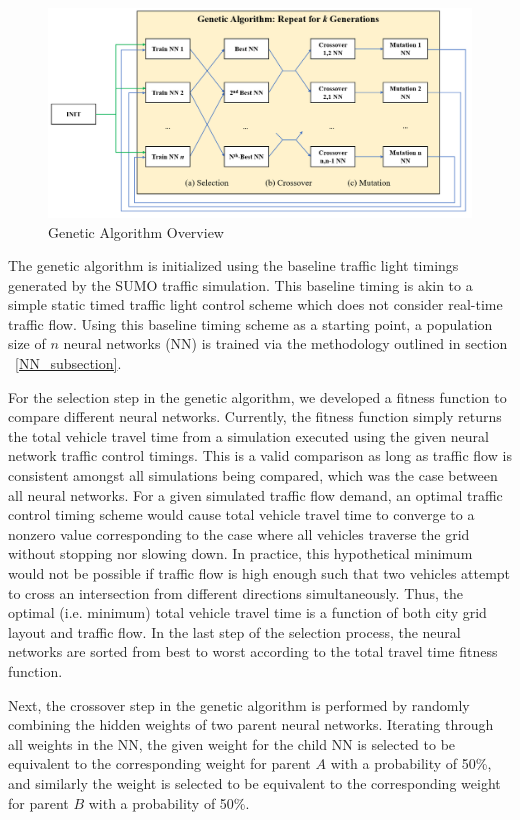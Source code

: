 \documentclass[twocolumn]{article}
\begin{document}
\begin{figure}[htp]
    \centering
    \includegraphics[width=\linewidth]{figures/genetic_overview.PNG}
    \caption{Genetic Algorithm Overview}
    \label{fig:genetic}
\end{figure}

The genetic algorithm is initialized using the baseline traffic light timings generated by the SUMO traffic simulation. This baseline timing is akin to a simple static timed traffic light control scheme which does not consider real-time traffic flow. Using this baseline timing scheme as a starting point, a population size of $n$ neural networks (NN) is trained via the methodology outlined in section ~\ref{NN_subsection}.

For the selection step in the genetic algorithm, we developed a fitness function to compare different neural networks. Currently, the fitness function simply returns the total vehicle travel time from a simulation executed using the given neural network traffic control timings. This is a valid comparison as long as traffic flow is consistent amongst all simulations being compared, which was the case between all neural networks. For a given simulated traffic flow demand, an optimal traffic control timing scheme would cause total vehicle travel time to converge to a nonzero value corresponding to the case where all vehicles traverse the grid without stopping nor slowing down. In practice, this hypothetical minimum would not be possible if traffic flow is high enough such that two vehicles attempt to cross an intersection from different directions simultaneously. Thus, the optimal (i.e. minimum) total vehicle travel time is a function of both city grid layout and traffic flow. In the last step of the selection process, the neural networks are sorted from best to worst according to the total travel time fitness function.

Next, the crossover step in the genetic algorithm is performed by randomly combining the hidden weights of two parent neural networks. Iterating through all weights in the NN, the given weight for the child NN is selected to be equivalent to the corresponding weight for parent $A$ with a probability of 50\%, and similarly the weight is selected to be equivalent to the corresponding weight for parent $B$ with a probability of 50\%.
\end{document}
